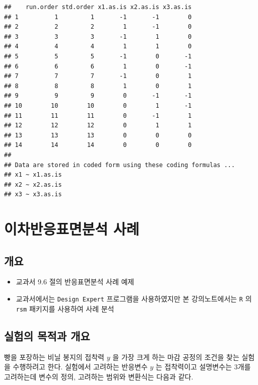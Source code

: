\documentclass[
]{book}
\providecommand{\tightlist}{%
  \setlength{\itemsep}{0pt}\setlength{\parskip}{0pt}}
\theoremstyle{definition}
\theoremstyle{definition}
\theoremstyle{definition}
\theoremstyle{definition}
\theoremstyle{remark}
\begin{document}
\begin{verbatim}
##    run.order std.order x1.as.is x2.as.is x3.as.is
## 1          1         1       -1       -1        0
## 2          2         2        1       -1        0
## 3          3         3       -1        1        0
## 4          4         4        1        1        0
## 5          5         5       -1        0       -1
## 6          6         6        1        0       -1
## 7          7         7       -1        0        1
## 8          8         8        1        0        1
## 9          9         9        0       -1       -1
## 10        10        10        0        1       -1
## 11        11        11        0       -1        1
## 12        12        12        0        1        1
## 13        13        13        0        0        0
## 14        14        14        0        0        0
## 
## Data are stored in coded form using these coding formulas ...
## x1 ~ x1.as.is
## x2 ~ x2.as.is
## x3 ~ x3.as.is
\end{verbatim}

\hypertarget{example}{%
\chapter{이차반응표면분석 사례}\label{example}}

\hypertarget{uxac1cuxc694-4}{%
\section{개요}\label{uxac1cuxc694-4}}

\begin{itemize}
\tightlist
\item
  교과서 9.6 절의 반응표면분석 사례 예제
\item
  교과서에서는 \texttt{Design\ Expert} 프로그램을 사용하였지만 본 강의노트에서는 \texttt{R} 의 \texttt{rsm} 패키지를 사용하여 사례 분석
\end{itemize}

\hypertarget{uxc2e4uxd5d8uxc758-uxbaa9uxc801uxacfc-uxac1cuxc694}{%
\section{실험의 목적과 개요}\label{uxc2e4uxd5d8uxc758-uxbaa9uxc801uxacfc-uxac1cuxc694}}

빵을 포장하는 비닐 봉지의 접착력 \(y\) 을 가장 크게 하는 마감 공정의 조건을 찾는 실험을 수행하려고 한다. 실험에서 고려하는 반응변수 \(y\) 는 접착력이고 설명변수는 3개를 고려하는데 변수의 정의, 고려하는 범위와 변환식는 다음과 같다.
\end{document}
